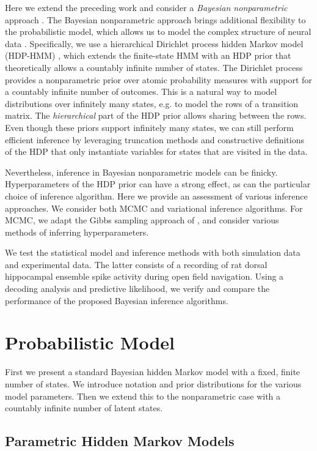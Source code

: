 Here we extend the preceding work and consider a \emph{Bayesian nonparametric} 
approach \citep{orbanz2011bayesian}.  The Bayesian nonparametric approach brings
additional flexibility to the probabilistic model, which allows us to
model the complex structure of neural data
\citep{Teh10,Wood08,Shalchyan14}.  Specifically, we use a hierarchical
Dirichlet process hidden Markov model (HDP-HMM) \citep{Teh06}, which
extends the finite-state HMM with an HDP prior that theoretically
allows a countably infinite number of states.  The Dirichlet process
provides a nonparametric prior over atomic probability measures with
support for a countably infinite number of outcomes. This is a natural
way to model distributions over infinitely many states, e.g. to model
the rows of a transition matrix.  The \emph{hierarchical} part of the
HDP prior allows sharing between the rows. Even though these priors
support infinitely many states, we can still perform efficient
inference by leveraging truncation methods and constructive
definitions of the HDP that only instantiate variables for states that
are visited in the data.

Nevertheless, inference in Bayesian nonparametric models can be
finicky.  Hyperparameters of the HDP prior can have a strong effect,
as can the particular choice of inference algorithm. Here we provide an
assessment of various inference approaches. We consider both
MCMC and variational inference algorithms. For MCMC, we adapt the
Gibbs sampling approach of \citep{Teh06}, and consider various methods
of inferring hyperparameters.

We test the statistical model and inference methods with both
simulation data and experimental data. The latter consists of a
recording of rat dorsal hippocampal ensemble spike activity during
open field navigation. Using a decoding analysis and predictive
likelihood, we verify and compare the performance of the proposed
Bayesian inference algorithms. 

\section{Probabilistic Model}

First we present a standard Bayesian hidden Markov model with a fixed,
finite number of states. We introduce notation and prior distributions
for the various model parameters. Then we extend this to the nonparametric
case with a countably infinite number of latent states.

\subsection{Parametric Hidden Markov Models} 

